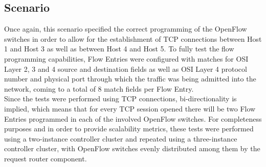 \subsection{Scenario}
\label{subsection:performance-tests-scenario}
Once again, this scenario specified the correct programming of the OpenFlow switches in order to allow for the establishment of \gls{TCP} connections between Host 1 and Host 3 as well as between Host 4 and Host 5.
To fully test the flow programming capabilities, Flow Entries were configured with matches for \gls{OSI} Layer 2, 3 and 4 source and destination fields as well as \gls{OSI} Layer 4 protocol number and physical port through which the traffic was being admitted into the network, coming to a total of 8 match fields per Flow Entry.\\
Since the tests were performed using \gls{TCP} connections, bi-directionality is implied, which means that for every \gls{TCP} session opened there will be two Flow Entries programmed in each of the involved OpenFlow switches.
For completeness purposes and in order to provide scalability metrics, these tests were performed using a two-instance controller cluster and repeated using a three-instance controller cluster, with OpenFlow switches evenly distributed among them by the request router component.
%
